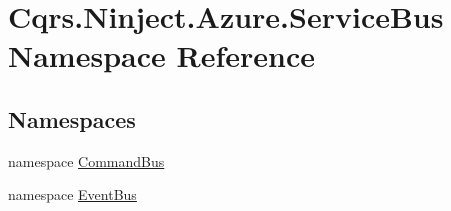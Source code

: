 \hypertarget{namespaceCqrs_1_1Ninject_1_1Azure_1_1ServiceBus}{}\section{Cqrs.\+Ninject.\+Azure.\+Service\+Bus Namespace Reference}
\label{namespaceCqrs_1_1Ninject_1_1Azure_1_1ServiceBus}
\subsection*{Namespaces}
\begin{DoxyCompactItemize}
\item 
namespace \hyperlink{namespaceCqrs_1_1Ninject_1_1Azure_1_1ServiceBus_1_1CommandBus}{Command\+Bus}
\item 
namespace \hyperlink{namespaceCqrs_1_1Ninject_1_1Azure_1_1ServiceBus_1_1EventBus}{Event\+Bus}
\end{DoxyCompactItemize}
